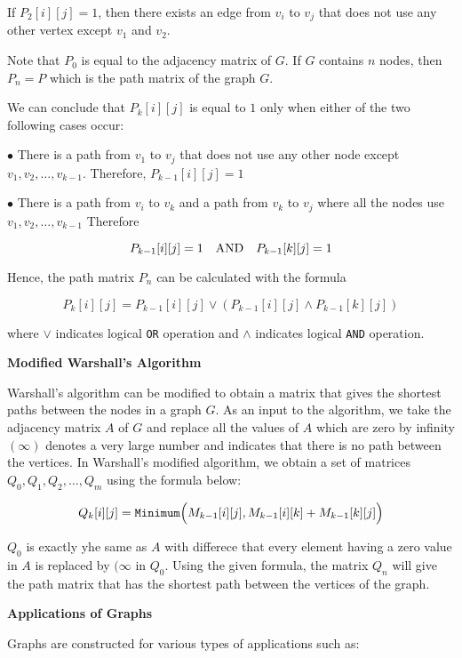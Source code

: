 \vskip 1mm
If $P_2[i][j]=1$, then there exists an edge from $v_i$ to $v_j$ that does not use any other vertex except $v_1$ and $v_2$.

\vskip 1mm
Note that $P_0$ is equal to the adjacency matrix of $G$. If $G$ contains $n$ nodes, then $P_n=P$ which is the path matrix of the graph $G$.

\vskip 1mm
We can conclude that $P_k[i][j]$ is equal to $1$ only when either of the two following cases occur:

\vskip 3mm
\qquad$\bullet$ There is a path from $v_1$ to $v_j$ that does not use any other node except $v_1,v_2,\ldots,v_{k-1}$. Therefore, $P_{k-1}[i][j]=1$

\vskip 3mm
\qquad$\bullet$ There is a path from $v_i$ to $v_k$ and a path from $v_k$ to $v_j$ where all the nodes use $v_1,v_2,\ldots,v_{k-1}$ Therefore

$$P_{k-1}[i][j]=1\quad\hbox{AND}\quad P_{k-1}[k][j]=1$$

Hence, the path matrix $P_n$ can be calculated with the formula

$$P_k[i][j]=P_{k-1}[i][j]\vee(P_{k-1}[i][j]\wedge P_{k-1}[k][j])$$

where $\vee$ indicates logical {\tt OR} operation and $\wedge$ indicates logical {\tt AND} operation.

\filbreak
\vskip 1cm
{\bf Modified Warshall's Algorithm}

\vskip 1mm
Warshall's algorithm can be modified to obtain a matrix that gives the shortest paths between the nodes in a graph $G$. As an input to the algorithm, we take the adjacency matrix $A$ of $G$ and replace all the values of $A$ which are zero by infinity $(\infty)$ denotes a very large number and indicates that there is no path between the vertices. In Warshall's modified algorithm, we obtain a set of matrices $Q_0,Q_1,Q_2,\ldots,Q_m$ using the formula below:

$$Q_k[i][j]=\hbox{\tt Minimum$\Bigl(M_{k-1}[i][j],M_{k-1}[i][k]+M_{k-1}[k][j]\Bigr)$}$$

$Q_0$ is exactly yhe same as $A$ with differece that every element having a zero value in $A$ is replaced by $(\infty$ in $Q_0$. Using the given formula, the matrix $Q_n$ will give the path matrix that has the shortest path between the vertices of the graph.

\filbreak
\vskip 1cm
{\bf Applications of Graphs}

\vskip 1mm
Graphs are constructed for various types of applications such as:

